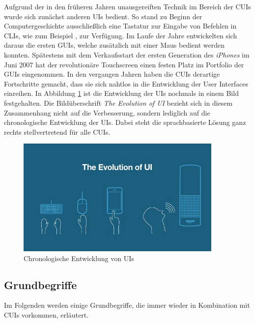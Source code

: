 Aufgrund der in den früheren Jahren unausgereiften Technik im Bereich der \acp{CUI} wurde sich zunächst anderen \acp{UI} bedient. So stand zu Beginn der Computergeschichte ausschließlich eine Tastatur zur Eingabe von Befehlen in \acp{CLI}, wie zum Beispiel , zur Verfügung. Im Laufe der Jahre entwickelten sich daraus die ersten \aclp{GUI}, welche zusätzlich mit einer Maus bedient werden konnten. Spätestens mit dem Verkaufsstart der ersten Generation des \textit{iPhones} im Juni 2007 \cite{molla_how_2017} hat der revolutionäre Touchscreen einen festen Platz im Portfolio der \aclp{GUI} eingenommen. In den vergangen Jahren haben die \acp{CUI} derartige Fortschritte gemacht, dass sie sich nahtlos in die Entwicklung der User Interfaces einreihen. In Abbildung \ref{fig:evolution-ui} ist die Entwicklung der \aclp{UI} nochmals in einem Bild festgehalten. Die Bildüberschrift \textit{The Evolution of \ac{UI}} bezieht sich in diesem Zusammenhang nicht auf die Verbesserung, sondern lediglich auf die chronologische Entwicklung der \aclp{UI}. Dabei steht die sprachbasierte Lösung ganz rechts stellvertretend für alle \aclp{CUI}.
\newline

\begin{figure}[htb]
    \centering
    \includegraphics[width=0.9\textwidth]{bilder/evolution-ui.jpg}
    \caption{Chronologische Entwicklung von \aclp{UI} \cite{techlabs_what_2017}}
    \label{fig:evolution-ui}
\end{figure}

\subsection{Grundbegriffe}
\label{subsec:cui-grundbegriffe}

Im Folgenden werden einige Grundbegriffe, die immer wieder in Kombination mit \acp{CUI} vorkommen, erläutert.

